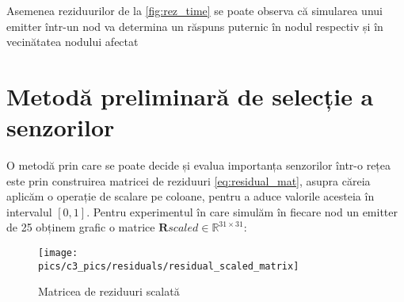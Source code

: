 Asemenea reziduurilor de la \ref{fig:rez_time} se poate observa că simularea unui emitter într-un nod va determina un răspuns puternic în nodul respectiv și în vecinătatea nodului afectat

\section{Metodă preliminară de selecție a senzorilor}
O metodă prin care se poate decide și evalua importanța senzorilor într-o rețea este prin construirea matricei de reziduuri \eqref{eq:residual_mat}, asupra căreia aplicăm o operație de scalare pe coloane, pentru a aduce valorile acesteia în intervalul $[0,1]$. Pentru experimentul în care simulăm în fiecare nod un emitter de 25 obținem grafic o matrice $\mathbf{R}scaled \in \mathbb{R}^{31 \times 31}$:

\begin{figure}[H]
\centering
\texttt{[image: \\pics/c3\_pics/residuals/residual\_scaled\_matrix]}
\caption{Matricea de reziduuri scalată}
\label{fig:rez_scaled_matrix_img}
\end{figure} 